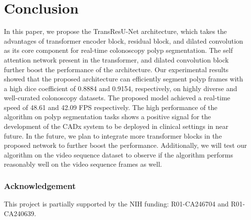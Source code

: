 \documentclass[conference]{IEEEtran}
\begin{document}
\section{Conclusion}
In this paper, we propose the TransResU-Net architecture, which takes the advantages of transformer encoder block, residual block, and dilated convolution as its core component for real-time colonoscopy polyp segmentation. The self attention network present in the transformer, and dilated convolution block further boost the performance of the architecture. Our experimental results showed that the proposed architecture can efficiently segment polyp frames with a high dice coefficient of 0.8884 and 0.9154, respectively, on highly diverse and well-curated colonoscopy datasets. The proposed model achieved a real-time speed of 48.61 and 42.09 FPS respectively. The high performance of the algorithm on polyp segmentation tasks shows a positive signal for the development of the CADx system to be deployed in clinical settings in near future.  In the future, we plan to integrate more transformer blocks in the proposed network to further boost the performance. Additionally, we will test our algorithm on the video sequence dataset to observe if the algorithm performs reasonably well on the video sequence frames as well. 

\subsubsection*{Acknowledgement}
This project is partially supported by the NIH funding: R01-CA246704 and R01-CA240639. 


 
\end{document}
